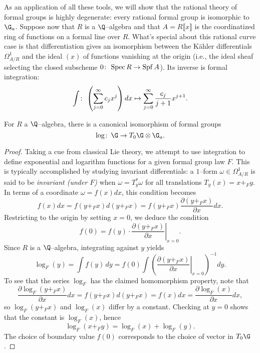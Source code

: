 As an application of all these tools, we will show that the rational theory of formal groups is highly degenerate: every rational formal group is isomorphic to $\G_a$.  Suppose now that $R$ is a $\Q$--algebra and that $A = R\llbracket x \rrbracket$ is the coordinatized ring of functions on a formal line over $R$.  What's special about this rational curve case is that differentiation gives an isomorphism between the K\"ahler differentials $\Omega^1_{A/R}$ and the ideal $(x)$ of functions vanishing at the origin (i.e., the ideal sheaf selecting the closed subscheme $0\colon\thinspace \operatorname{Spec} R \to \operatorname{Spf} A$).  Its inverse is formal integration: \[\int \colon\thinspace \left(\sum_{j=0}^\infty c_j x^j \right) dx \mapsto \sum_{j=0}^\infty \frac{c_j}{j+1} x^{j+1}.\]

\begin{theorem}\label{RationalFGLsHaveLogarithms}
For $R$ a $\Q$--algebra, there is a canonical isomorphism of formal groups \[\log\co \G \to T_0 \G \otimes \G_a.\]
\end{theorem}
\begin{proof}
Taking a cue from classical Lie theory, we attempt to use integration to define exponential and logarithm functions for a given formal group law $F$.  This is typically accomplished by studying invariant differentials: a $1$--form $\omega \in \Omega^1_{A/R}$ is said to be \textit{invariant (under $F$)} when $\omega = T_y^* \omega$ for all translations $T_y(x) = x +_F y$.  In terms of a coordinate $\omega = f(x) dx$, this condition becomes \[f(x) dx = f(y +_F x) d(y +_F x) = f(y +_F x) \frac{\partial(y +_F x)}{\partial x} dx.\]  Restricting to the origin by setting $x = 0$, we deduce the condition \[f(0) = f(y) \cdot \left. \frac{\partial(y +_F x)}{\partial x} \right|_{x=0}.\]  Since $R$ is a $\Q$--algebra, integrating against $y$ yields \[\log_F(y) = \int f(y) \, dy = f(0) \int \left( \left. \frac{\partial(y +_F x)}{\partial x} \right|_{x=0} \right)^{-1} dy.\]  To see that the series $\log_F$ has the claimed homomorphism property, note that \[\frac{\partial \log_F(y +_F x)}{\partial x} dx = f(y +_F x) d(y +_F x) = f(x) dx = \frac{\partial \log_F(x)}{\partial x} dx,\] so $\log_F(y +_F x)$ and $\log_F(x)$ differ by a constant.  Checking at $y = 0$ shows that the constant is $\log_F(x)$, hence \[\log_F(x +_F y) = \log_F(x) + \log_F(y).\]  The choice of boundary value $f(0)$ corresponds to the choice of vector in $T_0 \G$.
\end{proof}

